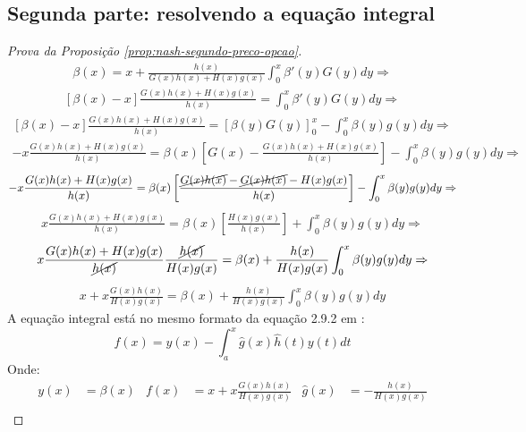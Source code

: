 \subsection{Segunda parte: resolvendo a equação integral}
\begin{proof}[Prova da Proposição \ref{prop:nash-segundo-preco-opcao}]
	\begin{align*}
		\beta(x) = x + \frac{h(x)}{G(x)h(x) + H(x)g(x)} \int_0^x \beta'(y)G(y)dy \Rightarrow
	\end{align*}
	\begin{align*}
		\left[ \beta(x) - x \right] \frac{G(x)h(x) + H(x)g(x)}{h(x)} = \int_0^x \beta'(y)G(y)dy \Rightarrow
	\end{align*}
	\begin{align*}
		\left[ \beta(x) - x \right] \frac{G(x)h(x) + H(x)g(x)}{h(x)} = \left[ \beta(y)G(y) \right]_0^x - \int_0^x \beta(y)g(y)dy \Rightarrow
	\end{align*}
	\begin{align*}
		-x \frac{G(x)h(x) + H(x)g(x)}{h(x)} = \beta(x) \left[ G(x) - \frac{G(x)h(x) + H(x)g(x)}{h(x)} \right] - \int_0^x \beta(y)g(y)dy \Rightarrow
	\end{align*}
	\begin{align*}
		-x \frac{G(x)h(x) + H(x)g(x)}{h(x)} = \beta(x) \left[ \frac{\cancel{G(x)h(x)} - \cancel{G(x)h(x)} - H(x)g(x)}{h(x)} \right] - \int_0^x \beta(y)g(y)dy \Rightarrow
	\end{align*}
	\begin{align*}
		x \frac{G(x)h(x) + H(x)g(x)}{h(x)} = \beta(x) \left[ \frac{H(x)g(x)}{h(x)} \right] + \int_0^x \beta(y)g(y)dy \Rightarrow
	\end{align*}
	\begin{align*}
		x \frac{G(x)h(x) + H(x)g(x)}{\cancel{h(x)}}\frac{\cancel{h(x)}}{H(x)g(x)} = \beta(x) + \frac{h(x)}{H(x)g(x)}\int_0^x \beta(y)g(y)dy \Rightarrow
	\end{align*}
	\begin{align*}
		x + x \frac{G(x)h(x)}{H(x)g(x)} = \beta(x) + \frac{h(x)}{H(x)g(x)}\int_0^x \beta(y)g(y)dy
	\end{align*}
	A equação integral está no mesmo formato da equação 2.9.2 em \citet{polyanin1998handbook}:
	\begin{equation*}
		f(x) = y(x) - \int_a^x \widehat{g}(x)\widehat{h}(t)y(t)dt
	\end{equation*}
	Onde:
	\begin{align*}
		y(x) & = \beta(x) & f(x) & = x + x \frac{G(x)h(x)}{H(x)g(x)} & \widehat{g}(x) & = -\frac{h(x)}{H(x)g(x)} \\

\end{align*}
\end{proof}
